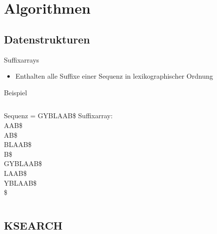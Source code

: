 \documentclass[xcolor=dvipsnames, aspectratio=1610]{beamer}
\begin{document}
\section{Algorithmen}

\subsection{Datenstrukturen}

\begin{frame}{Suffixarrays}
  \begin{itemize}
    \item Enthalten alle Suffixe einer Sequenz in lexikographischer Ordnung
  \end{itemize}
  \begin{block}{Beispiel}
    \begin{columns}
        Sequenz = GYBLAAB\$
      \scriptsize{}
        Suffixarray:\\
        AAB\$\\
        AB\$\\
        BLAAB\$\\
        B\$\\
        GYBLAAB\$\\
        LAAB\$\\
        YBLAAB\$\\
        \$\\
      \normalsize
    \end{columns}
  \end{block}
\end{frame}

\subsection{KSEARCH}
\end{document}
